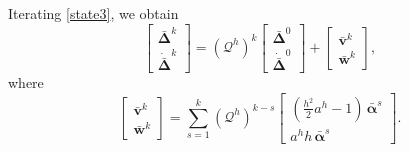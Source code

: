 \documentclass[letterpaper,journal]{IEEEtran}
\begin{document}
Iterating \eqref{state3}, we obtain
\begin{equation}\label{state4}
\begin{bmatrix}
\bar{\bm{\Delta}}^k \\[5pt]
\dot{\bar{\bm{\Delta}}}^k
\end{bmatrix}
=
\left(\mathcal Q^{h}\right)^k
\begin{bmatrix}
\bar{\bm{\Delta}}^{0} \\[5pt]
\dot{\bar{\bm{\Delta}}}^{0}
\end{bmatrix}
+
\begin{bmatrix}
\bar{\bm{v}}^{k}\\[5pt]
\bar{\bm{w}}^{k}
\end{bmatrix},
\end{equation}
where
\begin{equation}\label{barvbarw}
\begin{bmatrix}
\bar{\bm{v}}^k \\[5pt]
\bar{\bm{w}}^k
\end{bmatrix}
=
\sum_{s=1}^{k}
\left(\mathcal Q^{h}\right)^{k-s}
\begin{bmatrix}
(\tfrac{h^2}{2}a^h-1)\,\bar{\bm{\alpha}}^{s} \\[5pt]
a^h h\,\bar{\bm{\alpha}}^{s}
\end{bmatrix}.
\end{equation}
\end{document}

